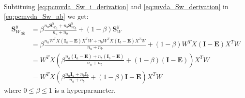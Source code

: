 \begin{appendix}
    Subtituing \eqref{eq:pcmvda_Sw_i_derivation} and \eqref{eq:mvda_Sw_derivation} in \eqref{eq:pcmvda_Sw_ab} we get:
    \begin{equation}
        \begin{split}
            {\boldsymbol{S}_W^y}_{ab} &= \beta\frac{n_a{\boldsymbol{S}_W^y}_a + n_b{\boldsymbol{S}_W^y}_b}{n_a + n_b} + (1 - \beta)\boldsymbol{S}_W^y \\
            &= \beta\frac{n_a W^T X \left(\boldsymbol{I}_a - \boldsymbol{E}\right) X^T W + n_b W^T X \left(\boldsymbol{I}_b - \boldsymbol{E}\right) X^T W}{n_a + n_b} + (1 - \beta)W^T X \left(\boldsymbol{I} - \boldsymbol{E}\right) X^T W \\
            &= W^T X \left(\beta\frac{n_a\left(\boldsymbol{I}_a - \boldsymbol{E}\right) + n_b\left(\boldsymbol{I}_b - \boldsymbol{E}\right)}{n_a + n_b} + (1 - \beta)\left(\boldsymbol{I} - \boldsymbol{E}\right)\right) X^T W \\
            &= W^T X \left(\beta\frac{n_a\boldsymbol{I}_a + n_b\boldsymbol{I}_b}{n_a + n_b} + (1 - \beta)\boldsymbol{I} - \boldsymbol{E}\right) X^T W
        \end{split}
        \label{eq:pcmvda_Sw_ab_derivation}
    \end{equation}
    where $0 \leq \beta \leq 1$ is a hyperparameter.


\end{appendix}
